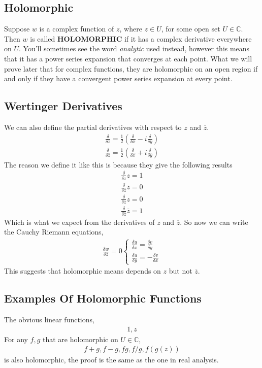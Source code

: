 \documentclass{article}
\begin{document}
\subsection{Holomorphic}
Suppose $w$ is a complex function of $z$, where $z \in U$, for some open set $U \in \mathbb{C}$. Then
$w$ is called \textbf{HOLOMORPHIC} if it has a complex derivative everywhere on $U$. You'll sometimes
see the word \textit{analytic} used instead, however this means that it has a power series expansion
that converges at each point. What we will prove later that for complex functions, they are holomorphic
on an open region if and only if they have a convergent power series expansion at every point.

\subsection{Wertinger Derivatives}
We can also define the partial derivatives with respect to $z$ and $\overline{z}$.
\begin{gather*}
	\frac{\delta}{\delta z} = \frac{1}{2}(\frac{\delta}{\delta x} - i\frac{\delta}{\delta y}) \\
	\frac{\delta}{\delta \overline{z}} = \frac{1}{2}(\frac{\delta}{\delta x} + i \frac{\delta}{\delta y})
\end{gather*}
The reason we define it like this is because they give the following results
\begin{gather*}
	\frac{\delta}{\delta z } z = 1 \\
	\frac{\delta}{\delta z } \overline{z} = 0 \\
	\frac{\delta}{\delta \overline{z} } z = 0 \\
	\frac{\delta}{\delta \overline{z} } \overline{z} = 1
\end{gather*}
Which is what we expect from the derivatives of $z$ and $\overline{z}$. So now we can write the
Cauchy Riemann equations,
\begin{gather*}
	\frac{\delta w}{\delta \overline{z}} = 0
	\begin{cases}
		\frac{\delta u}{\delta x} = \frac{\delta v }{\delta y} \\
		\frac{\delta u}{\delta y} = -\frac{\delta v}{\delta x}
	\end{cases}
\end{gather*}
This suggests that holomorphic means depends on $z$ but not $\overline{z}$.
\subsection{Examples Of Holomorphic Functions}
The obvious linear functions,
\begin{gather*}
	1, z
\end{gather*}
For any $f, g$ that are holomorphic on $U \in \mathbb{C}$,
\begin{gather*}
	f+g, f-g, fg, f/g, f(g(z))
\end{gather*}
is also holomorphic, the proof is the same as the one in real analysis.
\end{document}
